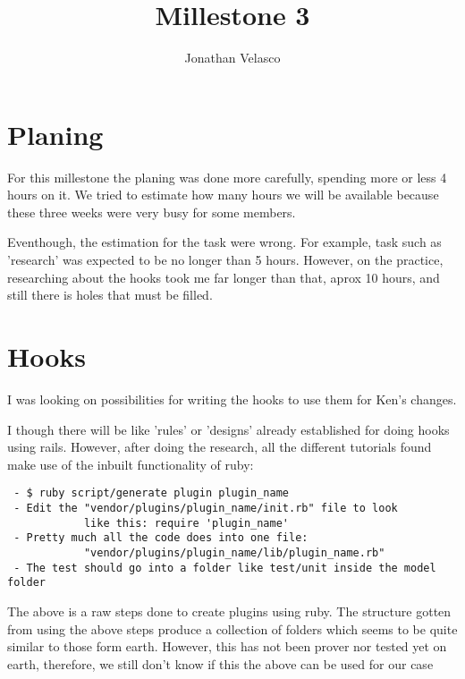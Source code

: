 \documentclass[a4paper,10pt]{article}
\title{Millestone 3}
\author{Jonathan Velasco}
\begin{document}
\maketitle


\section{Planing}

For this millestone the planing was done more carefully, spending more or less 4 hours on it.  We tried to estimate how many hours we will be available because these three weeks were very busy for some members.

Eventhough, the estimation for the task were wrong.  For example, task such as 'research' was expected to be no longer than 5 hours.  However, on the practice, researching about the hooks took me far longer than that, aprox 10 hours, and still there is holes that must be filled.

\section{Hooks}

I was looking on possibilities for writing the hooks to use them for Ken's changes.  

I though there will be like 'rules' or 'designs' already established for doing hooks using rails.  However, after doing the research, all the different tutorials found make use of the inbuilt functionality of ruby:

\begin{verbatim}
 - $ ruby script/generate plugin plugin_name
 - Edit the "vendor/plugins/plugin_name/init.rb" file to look 
            like this: require 'plugin_name' 
 - Pretty much all the code does into one file: 
            "vendor/plugins/plugin_name/lib/plugin_name.rb"
 - The test should go into a folder like test/unit inside the model folder
\end{verbatim}

The above is a raw steps done to create plugins using ruby.  The structure gotten from using the above steps produce a collection of folders which seems to be quite similar to those form earth.  However, this has not been prover nor tested yet on earth, therefore, we still don't know if this the above can be used for our case
\end{document}
